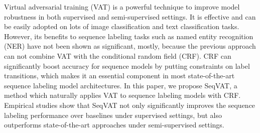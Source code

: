 Virtual adversarial training (VAT) is a powerful technique to improve model robustness in both supervised and semi-supervised settings. It is effective and can be easily adopted on lots of image classification and text classification tasks. However, its benefits to sequence labeling tasks such as named entity recognition (NER) have not been shown as significant, mostly, because the previous approach can not combine VAT with the conditional random field (CRF). CRF can significantly boost accuracy for sequence models by putting constraints on label transitions, which makes it an essential component in most state-of-the-art sequence labeling model architectures. In this paper, we propose SeqVAT, a method which naturally applies VAT to sequence labeling models with CRF. Empirical studies show that SeqVAT not only significantly improves the sequence labeling performance over baselines under supervised settings, but also outperforms state-of-the-art approaches under semi-supervised settings.

